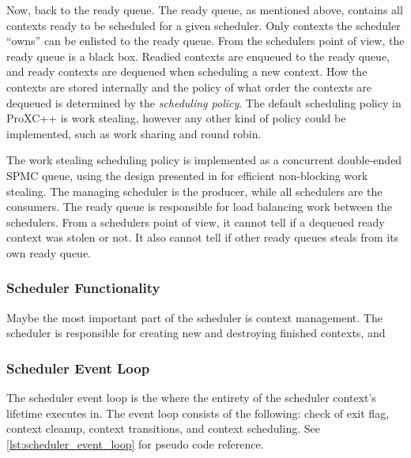 Now, back to the ready queue. The ready queue, as mentioned above, contains all contexts ready to be scheduled for a given scheduler. Only contexts the scheduler ``owns'' can be enlisted to the ready queue. From the schedulers point of view, the ready queue is a black box. Readied contexts are enqueued to the ready queue, and ready contexts are dequeued when scheduling a new context. How the contexts are stored internally and the policy of what order the contexts are dequeued is determined by the \textit{scheduling policy}. The default scheduling policy in ProXC++ is work stealing, however any other kind of policy could be implemented, such as work sharing and round robin.

The work stealing scheduling policy is implemented as a concurrent double\hyp{}ended SPMC queue, using the design presented in \citet{chase2005dynamic,le2013correct} for efficient non\hyp{}blocking work stealing. The managing scheduler is the producer, while all schedulers are the consumers. The ready queue is responsible for load balancing work between the schedulers. From a schedulers point of view, it cannot tell if a dequeued ready context was stolen or not. It also cannot tell if other ready queues steals from its own ready queue. 


\FloatBarrier
\subsubsection{Scheduler Functionality}

Maybe the most important part of the scheduler is context management. The scheduler is responsible for creating new and destroying finished contexts, and 


\FloatBarrier
\subsubsection{Scheduler Event Loop}

The scheduler event loop is the where the entirety of the scheduler context's lifetime executes in. The event loop consists of the following: check of exit flag, context cleanup, context transitions, and context scheduling. See \cref{lst:scheduler_event_loop} for pseudo code reference.

